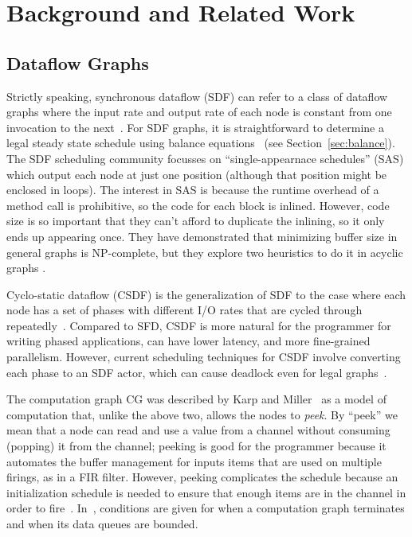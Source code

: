 \section{Background and Related Work}
\label{sec:related}

\subsection{Dataflow Graphs}

Strictly speaking, synchronous dataflow (SDF) can refer to a class of
dataflow graphs where the input rate and output rate of each node is
constant from one invocation to the next~\cite{LM87-i,LM87-ii}.  For
SDF graphs, it is straightforward to determine a legal steady state
schedule using balance equations~\cite{leesdf} (see
Section~\ref{sec:balance}).  The SDF scheduling community focusses on
``single-appearnace schedules'' (SAS) which output each node at just
one position (although that position might be enclosed in loops).  The
interest in SAS is because the runtime overhead of a method call is
prohibitive, so the code for each block is inlined.  However, code
size is so important that they can't afford to duplicate the inlining,
so it only ends up appearing once.  They have demonstrated that
minimizing buffer size in general graphs is NP-complete, but they
explore two heuristics to do it in acyclic graphs \cite{Bhatta97}.

Cyclo-static dataflow (CSDF) is the generalization of SDF to the case
where each node has a set of phases with different I/O rates that are
cycled through repeatedly~\cite{BEPL96,Parks95}.  Compared to SFD,
CSDF is more natural for the programmer for writing phased
applications, can have lower latency, and more fine-grained
parallelism.  However, current scheduling techniques for CSDF involve
converting each phase to an SDF actor, which can cause deadlock even
for legal graphs~\cite{BELP96}.

The computation graph {CG} was described by Karp and
Miller~\cite{Karp67} as a model of computation that, unlike the above
two, allows the nodes to {\it peek}.  By ``peek'' we mean that a node
can read and use a value from a channel without consuming (popping) it
from the channel; peeking is good for the programmer because it
automates the buffer management for inputs items that are used on
multiple firings, as in a FIR filter.  However, peeking complicates
the schedule because an initialization schedule is needed to ensure
that enough items are in the channel in order to fire~\cite{Gordo02}.
In~\cite{Karp67}, conditions are given for when a computation graph
terminates and when its data queues are bounded.

